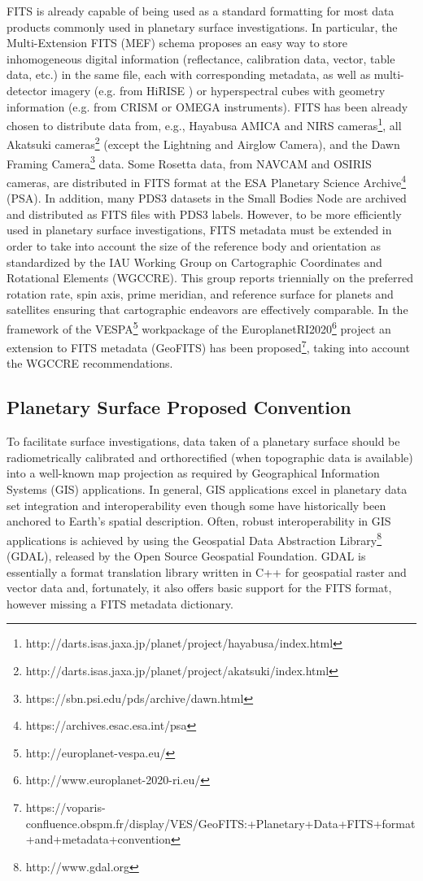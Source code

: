 FITS is already capable of being used as a standard formatting for most data products
commonly used in planetary surface investigations.
In particular, the Multi-Extension FITS (MEF) schema proposes an easy way
to store inhomogeneous digital information (reflectance, calibration data,
vector, table data, etc.) in the same file, each with corresponding metadata,
as well as multi-detector imagery (e.g. from HiRISE \citep{hirise})
or hyperspectral cubes with geometry information (e.g. from CRISM
\citep{crism} or OMEGA \citep{omega} instruments).
FITS has been already chosen to distribute data from, e.g.,
Hayabusa AMICA and NIRS cameras\footnote{http://darts.isas.jaxa.jp/planet/project/hayabusa/index.html},
all Akatsuki cameras\footnote{http://darts.isas.jaxa.jp/planet/project/akatsuki/index.html}
(except the Lightning and Airglow Camera),
and the Dawn Framing Camera\footnote{https://sbn.psi.edu/pds/archive/dawn.html} data.
Some Rosetta data, from NAVCAM and OSIRIS cameras, are distributed in FITS format at
the ESA Planetary Science Archive\footnote{https://archives.esac.esa.int/psa} (PSA).
In addition, many PDS3 datasets in the Small Bodies Node are archived and distributed
as FITS files with PDS3 labels.
However, to be more efficiently used in planetary surface investigations, FITS metadata
must be extended in order to take into account the size of the reference body and
orientation as standardized by the IAU Working Group on Cartographic Coordinates and
Rotational Elements (WGCCRE).
This group reports triennially \citep{wgccre} on the preferred rotation rate,
spin axis, prime meridian, and reference surface for planets and satellites
ensuring that cartographic endeavors are effectively comparable.
In the framework of the VESPA\footnote{http://europlanet-vespa.eu/}
\citep{vespapss} workpackage of the EuroplanetRI2020\footnote{http://www.europlanet-2020-ri.eu/}
project an extension to FITS metadata (GeoFITS) has been
proposed\footnote{https://voparis-confluence.obspm.fr/display/VES/GeoFITS:+Planetary+Data+FITS+format+and+metadata+convention},
taking into account the WGCCRE recommendations.

\subsection{Planetary Surface Proposed Convention}
\label{ssec:geofits}
To facilitate surface investigations, data taken of a planetary surface should be
radiometrically calibrated and orthorectified (when topographic data is available)
into a well-known map projection as required by Geographical Information Systems (GIS)
applications.
In general, GIS applications excel in planetary data set integration and 
interoperability even though some have historically been anchored to Earth's spatial
description.
Often, robust interoperability in GIS applications is achieved by using the Geospatial
Data Abstraction Library\footnote{http://www.gdal.org} (GDAL), released by the Open
Source Geospatial Foundation.
GDAL is essentially a format translation library written in C++ for geospatial raster
and vector data and, fortunately, it also offers basic support for the FITS format,
however missing a FITS metadata dictionary. 

